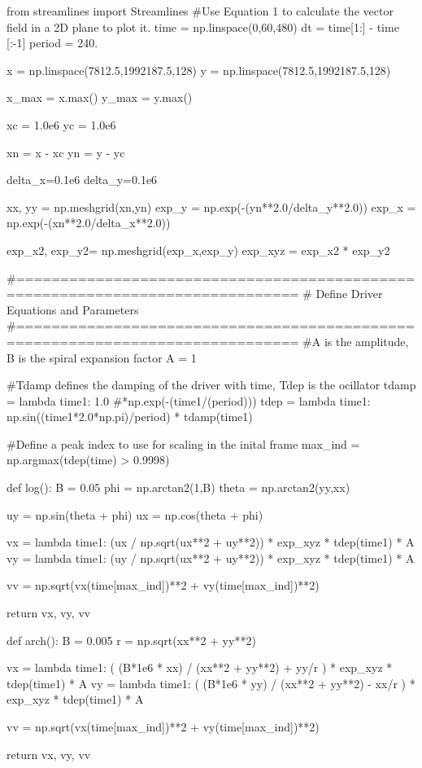 \begin{pycode}[chapter3]
from streamlines import Streamlines
#Use Equation 1 to calculate the vector field in a 2D plane to plot it.
time = np.linspace(0,60,480)
dt = time[1:] - time [:-1]
period = 240.

x = np.linspace(7812.5,1992187.5,128)
y = np.linspace(7812.5,1992187.5,128)

x_max = x.max()
y_max = y.max()

xc = 1.0e6
yc = 1.0e6

xn = x - xc
yn = y - yc

delta_x=0.1e6
delta_y=0.1e6

xx, yy = np.meshgrid(xn,yn)
exp_y = np.exp(-(yn**2.0/delta_y**2.0))
exp_x = np.exp(-(xn**2.0/delta_x**2.0))

exp_x2, exp_y2= np.meshgrid(exp_x,exp_y)
exp_xyz = exp_x2 * exp_y2


#==============================================================================
# Define Driver Equations and Parameters
#==============================================================================
#A is the amplitude, B is the spiral expansion factor
A = 1

#Tdamp defines the damping of the driver with time, Tdep is the ocillator
tdamp = lambda time1: 1.0 #*np.exp(-(time1/(period)))
tdep = lambda time1: np.sin((time1*2.0*np.pi)/period) * tdamp(time1)

#Define a peak index to use for scaling in the inital frame
max_ind = np.argmax(tdep(time) > 0.9998)

def log():
	B = 0.05
	phi = np.arctan2(1,B)
	theta = np.arctan2(yy,xx)
	
	uy = np.sin(theta + phi)
	ux =  np.cos(theta + phi)
	
	vx = lambda time1: (ux / np.sqrt(ux**2 + uy**2)) * exp_xyz * tdep(time1) * A
	vy = lambda time1: (uy / np.sqrt(ux**2 + uy**2)) * exp_xyz * tdep(time1) * A
	
	vv = np.sqrt(vx(time[max_ind])**2 + vy(time[max_ind])**2)
	
	return vx, vy, vv

def arch():
	B = 0.005
	r = np.sqrt(xx**2 + yy**2)
	
	vx = lambda time1: ( (B*1e6 * xx) / (xx**2 + yy**2) + yy/r ) * exp_xyz * tdep(time1) * A
	vy = lambda time1: ( (B*1e6 * yy) / (xx**2 + yy**2) - xx/r ) * exp_xyz * tdep(time1) * A
	
	vv = np.sqrt(vx(time[max_ind])**2 + vy(time[max_ind])**2)
	
	return vx, vy, vv


\end{pycode}
